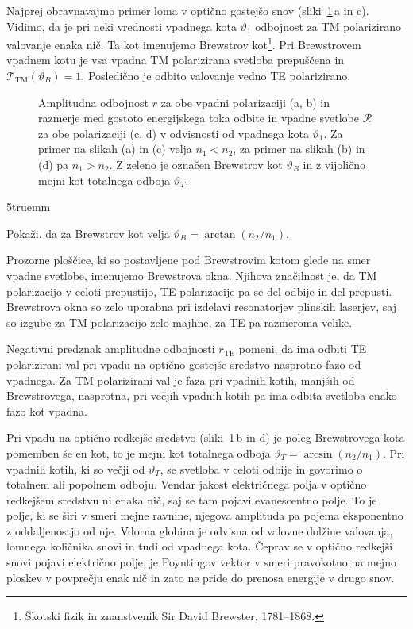 Najprej obravnavajmo primer loma v optično gostejšo snov 
(sliki~\ref{fig:Brewster}\,a in c). Vidimo, da je pri neki vrednosti vpadnega kota $\vartheta_1$ odbojnost za 
TM polarizirano valovanje enaka nič. Ta kot imenujemo Brewstrov 
kot\footnote{Škotski fizik in znanstvenik Sir David Brewster, 1781--1868.}. 
Pri Brewstrovem vpadnem kotu je vsa vpadna TM polarizirana svetloba prepuščena
in $\mathcal{T}_\mathrm{TM}(\vartheta_B)=1$. Posledično je odbito valovanje vedno TE
polarizirano. 
\begin{figure}[h]
\centering
  \def\svgwidth{140truemm} 
  
\caption{Amplitudna odbojnost $r$ za obe vpadni polarizaciji (a, b) in razmerje med 
gostoto energijskega toka odbite in vpadne svetlobe $\mathcal{R}$ za obe polarizaciji (c, d)
v odvisnosti od vpadnega kota $\vartheta_1$. Za primer na slikah (a) in (c) velja $n_1<n_2$, za primer na 
slikah (b) in (d) pa $n_1>n_2$. Z zeleno je označen Brewstrov kot $\vartheta_B$ in
z vijolično mejni kot totalnega odboja $\vartheta_T$.}
\label{fig:Brewster}
\end{figure}
\vglue5truemm
\begin{definition}
Pokaži, da za Brewstrov kot velja 
$\vartheta_{B}=\arctan\left(n_2/n_1\right).$
\label{eq:Brew}
\end{definition}
\begin{remark}
Prozorne ploščice, ki so postavljene pod Brewstrovim kotom glede na smer vpadne svetlobe, 
imenujemo Brewstrova okna. Njihova značilnost je,
da TM polarizacijo v celoti prepustijo, TE polarizacije pa se del odbije in  
del prepusti. Brewstrova okna so zelo uporabna pri izdelavi resonatorjev 
plinskih laserjev, saj so izgube za TM polarizacijo zelo majhne, 
za TE pa razmeroma velike.  
\end{remark}

Negativni predznak amplitudne odbojnosti $r_{\mathrm{TE}}$ pomeni, da ima odbiti TE 
polarizirani val pri vpadu na optično gostejše sredstvo nasprotno 
fazo od vpadnega. Za TM polarizirani val je faza pri vpadnih kotih, manjših od Brewstrovega, 
nasprotna, pri večjih vpadnih kotih pa ima odbita svetloba enako fazo kot vpadna. 

Pri vpadu na optično redkejše sredstvo (sliki~\ref{fig:Brewster}\,b in d) je poleg Brewstrovega kota
pomemben še en kot, to je mejni kot totalnega odboja $\vartheta_T = \arcsin\left(n_2/n_1\right)$. 
Pri vpadnih kotih, ki so večji od $\vartheta_T$, se svetloba v celoti odbije in govorimo
o totalnem ali popolnem odboju. 
Vendar jakost električnega polja v optično redkejšem sredstvu
ni enaka nič, saj se tam pojavi evanescentno polje.
To je polje, ki se širi v smeri mejne ravnine, njegova amplituda pa pojema 
eksponentno z oddaljenostjo od nje. Vdorna globina je odvisna od valovne 
dolžine valovanja, lomnega količnika snovi in tudi od vpadnega kota. 
Čeprav se v optično redkejši snovi pojavi električno polje, je Poyntingov
vektor v smeri pravokotno na mejno ploskev v povprečju enak nič in zato ne pride do prenosa energije
v drugo snov.

